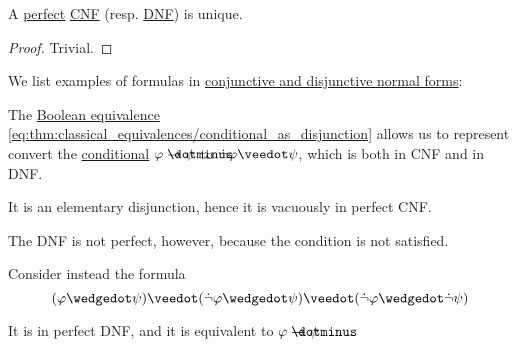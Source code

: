 \begin{proposition}\label{thm:full_cnf_and_dnf_uniqueness}
  A \hyperref[def:full_cnf_and_dnf]{perfect} \hyperref[def:cnf_and_dnf]{CNF} (resp. \hyperref[def:cnf_and_dnf]{DNF}) is unique.
\end{proposition}
\begin{proof}
  Trivial.
\end{proof}

\begin{example}\label{ex:def:cnf_and_dnf}
  We list examples of formulas in \hyperref[def:cnf_and_dnf]{conjunctive and disjunctive normal forms}:
  \begin{thmenum}
     The \hyperref[thm:classical_equivalences]{Boolean equivalence} \eqref{eq:thm:classical_equivalences/conditional_as_disjunction} allows us to represent convert the \hyperref[def:propositional_alphabet/connectives/conditional]{conditional} \( \varphi \synimplies \psi \) to \( \synneg \varphi \synvee \psi \), which is both in CNF and in DNF.

    It is an elementary disjunction, hence it is vacuously in perfect CNF.

    The DNF is not perfect, however, because the condition  is not satisfied.

     Consider instead the formula
    \begin{equation*}
      (\varphi \synwedge \psi) \synvee (\synneg \varphi \synwedge \psi) \synvee (\synneg \varphi \synwedge \synneg \psi)
    \end{equation*}

    It is in perfect DNF, and it is equivalent to \( \varphi \synimplies \psi \).
  \end{thmenum}
\end{example}

